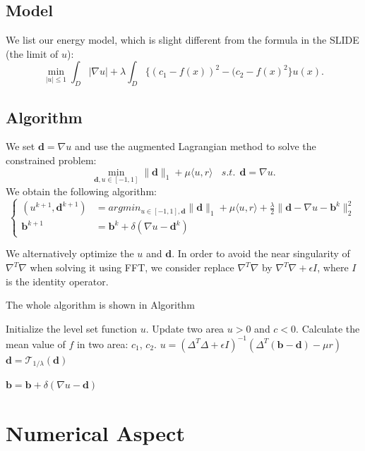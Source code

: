\documentclass{article}
\begin{document}
\subsection{Model}
We list our energy model, which is slight different from the formula in the SLIDE (the limit of $u$):
$$\min_{|u|\le 1}\int_D |\nabla u| + \lambda \int_D \{(c_1-f(x))^2 - (c_2-f(x)^2\}u(x).$$
\subsection{Algorithm}

We set $\bm{d} = \nabla u$ and use the augmented Lagrangian method to solve the constrained problem:
$$\min_{\bm{d},u\in[-1,1]} \|\bm{d}\|_1 + \mu\langle u,r \rangle~~~~s.t. ~~ \bm{d} = \nabla u.$$
We obtain the following algorithm:
$$\left\{ \begin{array}{rl} (u^{k+1}, \bm{d}^{k+1}) & = argmin_{u\in [-1,1], \bm{d}} \|\bm{d}\|_1 + \mu\langle u,r \rangle + \frac{\lambda}{2} \|\bm{d} - \nabla u - \bm{b}^k\|_2^2\\ \bm{b}^{k+1} &= \bm{b}^k + \delta(\nabla u - \bm{d}^k) \end{array} \right.$$

We alternatively optimize the $u$ and $\bm{d}$. In order to avoid the near singularity of $\nabla^T \nabla$ when solving it using FFT, we consider replace $\nabla^T \nabla$ by $\nabla^T \nabla + \epsilon I$, where $I$ is the identity operator.
 
The whole algorithm is shown in Algorithm

\begin{algorithm}[H]
\caption{$u = ms(f,lambda,outer iter, inner iter)$}
\begin{algorithmic}
\STATE Initialize the level set function $u$.
\STATE Update two area $u>0$ and $c<0$.
\STATE Calculate the mean value of $f$ in two area: $c_1$, $c_2$.
\STATE $u = (\Delta^T\Delta + \epsilon I)^{-1}(\Delta^T(\bm{b}-\bm{d}) - \mu r)$
\STATE $\bm{d} = \mathcal{T}_{1/\lambda}(\bm{d})$

\STATE $\bm{b} = \bm{b} + \delta(\nabla u - \bm{d})$
\ENDFOR
\ENDFOR

\end{algorithmic}

\end{algorithm}

\section{Numerical Aspect}
\end{document}
